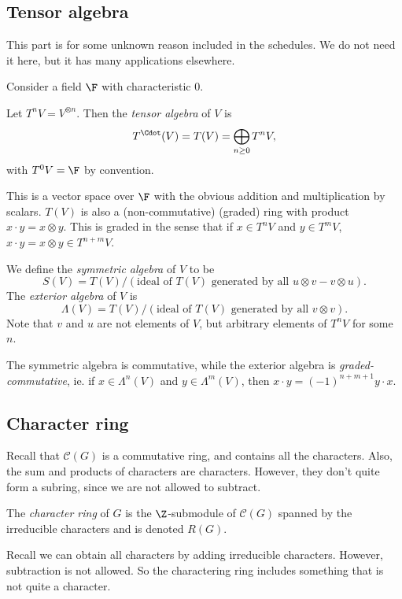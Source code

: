 \documentclass[a4paper]{article}
\begin{document}
\subsection{Tensor algebra}
This part is for some unknown reason included in the schedules. We do not need it here, but it has many applications elsewhere.

Consider a field $\F$ with characteristic $0$.

\begin{defi}
  Let $T^nV = V^{\otimes n}$. Then the \emph{tensor algebra} of $V$ is
  \[
    T^{\Cdot}(V) = T(V) = \bigoplus_{n\geq 0} T^nV,
  \]
  with $T^0V = \F$ by convention.

  This is a vector space over $\F$ with the obvious addition and multiplication by scalars. $T(V)$ is also a (non-commutative) (graded) ring with product $x \cdot y = x\otimes y$. This is graded in the sense that if $x \in T^n V$ and $y \in T^m V$, $x \cdot y = x\otimes y \in T^{n + m}V$.
\end{defi}

\begin{defi}
  We define the \emph{symmetric algebra} of $V$ to be
  \[
    S(V) = T(V) / (\text{ideal of $T(V)$ generated by all $u\otimes v - v\otimes u$}).
  \]
  The \emph{exterior algebra} of $V$ is
  \[
    \Lambda(V) = T(V) / (\text{ideal of $T(V)$ generated by all $v \otimes v$}).
  \]
  Note that $v$ and $u$ are not elements of $V$, but arbitrary elements of $T^n V$ for some $n$.
\end{defi}
The symmetric algebra is commutative, while the exterior algebra is \emph{graded-commutative}, ie. if $x \in \Lambda^n(V)$ and $y \in \Lambda^m(V)$, then $x\cdot y = (-1)^{n + m + 1} y \cdot x$.

\subsection{Character ring}
Recall that $\mathcal{C}(G)$ is a commutative ring, and contains all the characters. Also, the sum and products of characters are characters. However, they don't quite form a subring, since we are not allowed to subtract.

\begin{defi}
  The \emph{character ring} of $G$ is the $\Z$-submodule of $\mathcal{C}(G)$ spanned by the irreducible characters and is denoted $R(G)$.
\end{defi}
Recall we can obtain all characters by adding irreducible characters. However, subtraction is not allowed. So the charactering ring includes something that is not quite a character.
\end{document}
